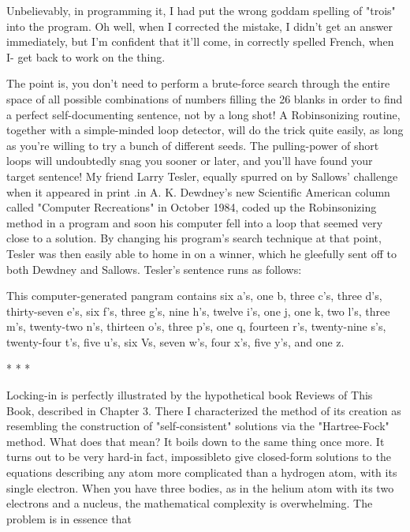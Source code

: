   Unbelievably, in programming it, I had put the wrong goddam spelling of
  "trois" into the program. Oh well, when I corrected the mistake, I didn't get an
  answer immediately, but I'm confident that it'll come, in correctly spelled
  French, when I- get back to work on the thing.

The point is, you don't need to perform a brute-force search through the entire space
of all possible combinations of numbers filling the 26 blanks in order to find a perfect
self-documenting sentence, not by a long shot! A Robinsonizing routine, together
with a simple-minded loop detector, will do the trick quite easily, as long as you're
willing to try a bunch of different seeds. The pulling-power of short loops will
undoubtedly snag you sooner or later, and you'll have found your target sentence!
        My friend Larry Tesler, equally spurred on by Sallows' challenge when it
appeared in print .in A. K. Dewdney's new Scientific American column called
"Computer Recreations" in October 1984, coded up the Robinsonizing method in a
program and soon his computer fell into a loop that seemed very close to a solution.
By changing his program's search technique at that point, Tesler was then easily able
to home in on a winner, which he gleefully sent off to both Dewdney and Sallows.
Tesler's sentence runs as follows:

  This computer-generated pangram contains six a's, one b, three c's, three d's,
  thirty-seven e's, six f's, three g's, nine h's, twelve i's, one j, one k, two l's, three
  m's, twenty-two n's, thirteen o's, three p's, one q, fourteen r's, twenty-nine s's,
  twenty-four t's, five u's, six Vs, seven w's, four x's, five y's, and one z.

                                         *   *    *

       Locking-in is perfectly illustrated by the hypothetical book Reviews of This
Book, described in Chapter 3. There I characterized the method of its creation as
resembling the construction of "self-consistent" solutions via the "Hartree-Fock"
method. What does that mean? It boils down to the same thing once more. It turns out
to be very hard-in fact, impossibleto give closed-form solutions to the equations
describing any atom more complicated than a hydrogen atom, with its single electron.
When you have three bodies, as in the helium atom with its two electrons and a
nucleus, the mathematical complexity is overwhelming. The problem is in essence
that




